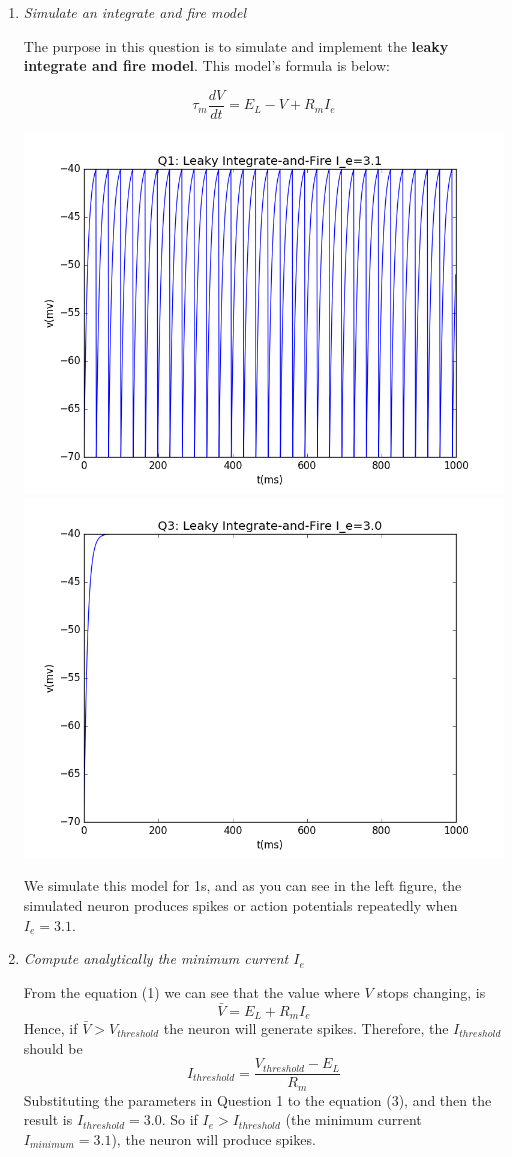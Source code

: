 \documentclass[12pt]{article}
\begin{document}
  \begin{enumerate}

    \item \textit{Simulate an integrate and fire model}
    
    The purpose in this question is to simulate and implement the \textbf{leaky integrate and fire model}. This model's formula is below:
    
    \begin{equation}
	  \tau_m\frac{dV}{dt}=E_L-V+R_mI_e
  	\end{equation}
    

    \includegraphics[width=0.5\linewidth]{figure_q1.png}
    \includegraphics[width=0.5\linewidth]{figure_q3.png}

    We simulate this model for 1s, and as you can see in the left figure, the simulated neuron produces spikes or action potentials repeatedly when $I_e=3.1$.
          
    \item \textit{Compute analytically the minimum current $I_e$}
    
    From the equation (1) we can see that the value where $V$ stops changing, is
    \begin{equation}
    	\bar{V}=E_L+R_mI_e
    \end{equation}
    Hence, if $\bar{V}>V_{threshold}$ the neuron will generate spikes. Therefore, the $I_{threshold}$ should be
    \begin{equation}
        I_{threshold}=\frac{V_{threshold}-E_L}{R_m}
    \end{equation}
    Substituting the parameters in Question 1 to the equation (3), and then the result is $I_{threshold}=3.0$. So if $I_e>I_{threshold}$ (the minimum current $I_{minimum}=3.1$), the neuron will produce spikes.
    

\end{enumerate}
\end{document}
